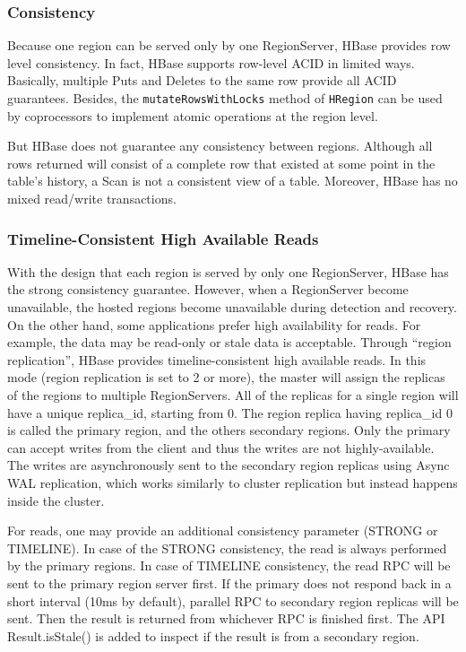 \documentclass[12pt]{book}
\begin{document}
\subsubsection{Consistency}
Because one region can be served only by one RegionServer, HBase provides row level consistency. In fact, HBase supports row-level ACID in limited ways. Basically, multiple Puts and Deletes to the same row provide all ACID guarantees. Besides, the \texttt{mutateRowsWithLocks} method of \texttt{HRegion} can be used by coprocessors to implement atomic operations at the region level.

But HBase does not guarantee any consistency between regions. Although all rows returned will consist of a complete row that existed at some point in the table's history, a Scan is not a consistent view of a table. Moreover,  HBase has no mixed read/write transactions.

\subsubsection{Timeline-Consistent High Available Reads}
With the design that each region is served by only one RegionServer, HBase has the strong consistency guarantee. However, when a RegionServer become unavailable, the hosted regions become unavailable during detection and recovery. On the other hand, some applications prefer high availability for reads. For example, the data may be read-only or stale data is acceptable. Through ``region replication'', HBase provides timeline-consistent high available reads. In this mode (region replication is set to 2 or more), the master will assign the replicas of the regions to multiple RegionServers.  All of the replicas for a single region will have a unique replica\_id, starting from 0. The region replica having replica\_id 0 is called the primary region, and the others secondary regions. Only the primary can accept writes from the client and thus the writes are not highly-available. The writes are asynchronously sent to the secondary region replicas using Async WAL replication, which works similarly to cluster replication but instead happens inside the cluster.

For reads, one may provide an additional consistency parameter (STRONG or TIMELINE). In case of the STRONG consistency, the read is always performed by the primary regions. In case of TIMELINE consistency, the read RPC will be sent to the primary region server first. If the primary does not respond back in a short interval (10ms by default), parallel RPC to secondary region replicas will be sent. Then the result is returned from whichever RPC is finished first. The API Result.isStale() is added to inspect if the result is from a secondary region.
\end{document}
